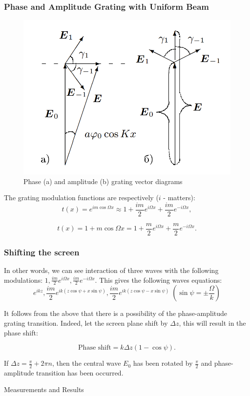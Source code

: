 \documentclass{beamer}
\begin{document}
	\begin{frame}
		\frametitle{Phase and Amplitude Grating with Uniform Beam}
		
		\begin{figure}
			\centering
			\includegraphics[width=0.5\linewidth]{res/amplitude_phase_grating}
			\caption{Phase (a) and amplitude (b) grating vector diagrams}
			\label{fig:amplitudephasegrating}
		\end{figure}
		
		The grating modulation functions are respectively ($i$ - matters):
		$$	t(x) = e^{i m \cos \Omega x} \approx 1 + \frac{im}{2}e^{i \Omega x} + \frac{im}{2}e^{-i \Omega x},$$
		
		$$	t(x) = 1 + m \cos{\Omega x} = 1 + \frac{m}{2}e^{i \Omega x} + \frac{m}{2}e^{-i \Omega x}. $$
	
	\end{frame}	

		\begin{frame}
		\frametitle{Shifting the screen}

		In other words, we can see interaction of three waves with the following modulations:
		 $1, \frac{im}{2}e^{i \Omega x},\frac{im}{2}e^{-i \Omega x}$. This gives the following waves equations: 
		$$e^{i kz}, \frac{im}{2}e^{i k(z\cos{\psi} + x\sin{\psi})},\frac{im}{2}e^{i k(z\cos{\psi} - x\sin{\psi})} \; \left(\sin{\psi} = \pm\frac{\Omega}{k}  \right)$$
		
		
		It follows from the above that there is a possibility of the phase-amplitude grating transition. Indeed, let the screen plane shift by $\Delta z$, this will result in the phase shift:
		
		$$\text{Phase shift} = k\Delta z(1 - \cos{\psi}).$$
		
		
		If $\Delta z = \frac{\pi}{2} + 2\pi n$, then the central wave $E_0$ has been rotated by $\frac{\pi}{2}$ and phase-amplitude transition has been occurred.
	\end{frame}

	\begin{frame}[plain,c]
		
		\begin{center}
			\huge {} Measurements and Results
		\end{center}
		
	\end{frame}
\end{document}
